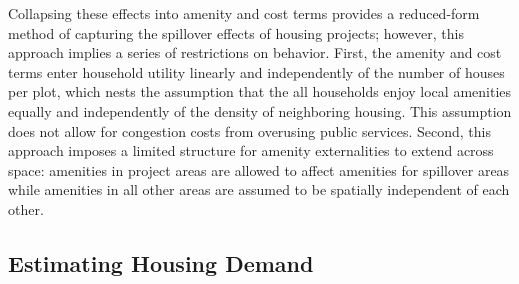 \documentclass[12pt]{article}
\begin{document}
Collapsing these effects into amenity and cost terms provides a reduced-form method of capturing the spillover effects of housing projects; however, this approach implies a series of restrictions on behavior.  First, the amenity and cost terms enter household utility linearly and independently of the number of houses per plot, which nests the assumption that the all households enjoy local amenities equally and independently of the density of neighboring housing.  This assumption does not allow for congestion costs from overusing public services.  Second, this approach imposes a limited structure for amenity externalities to extend across space:  amenities in project areas are allowed to affect amenities for spillover areas while amenities in all other areas are assumed to be spatially independent of each other.  


\subsection{Estimating Housing Demand}
\end{document}

